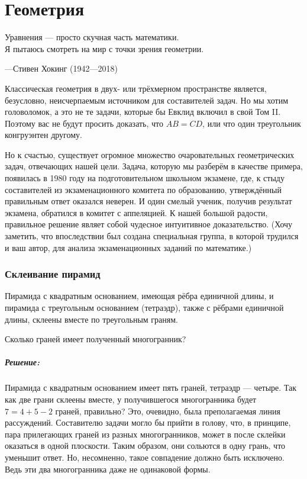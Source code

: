 \chapter*{Геометрия}

\setlength{\epigraphwidth}{.72\textwidth}
\epigraph{Уравнения --- просто скучная часть математики.\\
Я пытаюсь смотреть на мир с точки зрения геометрии.}{---Стивен Хокинг (1942---2018)}

Классическая геометрия в двух- или трёхмерном пространстве является, безусловно, неисчерпаемым источником для составителей задач. %
Но мы хотим головоломок, а это не те задачи, которые бы Евклид включил в свой Том II.
Поэтому вас не будут просить доказать, что $AB=CD$, или что один треугольник конгруэнтен другому.

Но к счастью, существует огромное множество очаровательных геометрических задач, отвечающих нашей цели. 
Задача, которую мы разберём в качестве примера, появилась в 1980 году на подготовительном  школьном экзамене, %
где, к стыду составителей из экзаменационного комитета по образованию, %
утверждённый правильным ответ оказался неверен.
И один смелый ученик, получив результат экзамена, обратился в комитет с аппеляцией.
К нашей большой радости, правильное решение являет собой  чудесное интуитивное доказательство.
(Хочу заметить, что впоследствии был создана специальная группа, в которой  трудился и ваш автор, для анализа экзаменационных заданий по математике.)

\subsection*{Склеивание пирамид}%

Пирамида с квадратным основанием, имеющая рёбра единичной длины, и пирамида с треугольным основанием (тетраэдр), также с рёбрами единичной длины, склеены вместе по треугольным граням.

Сколько граней имеет полученный многогранник?

\paragraph{Решение:}

Пирамида с квадратным основанием имеет пять граней, тетраэдр --- четыре.
Так как две грани склеены вместе, у получившегося многогранника будет $7=4+5-2$ граней, правильно?
Это, очевидно, была преполагаемая линия рассуждений.
Составителю задачи могло бы прийти в голову, что, в принципе, пара прилегающих граней из разных многогранников, может в после склейки оказаться в одной плоскости.
Таким образом, они сольются в одну грань, что уменьшит ответ.
Но, несомненно, такое совпадение должно быть исключено.
Ведь эти два многогранника даже не одинаковой формы.

